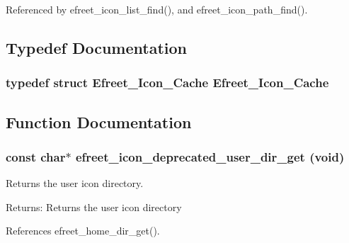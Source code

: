 Referenced by efreet\_\-icon\_\-list\_\-find(), and efreet\_\-icon\_\-path\_\-find().

\subsection{Typedef Documentation}
\subsubsection[Efreet\_\-Icon\_\-Cache]{\setlength{\rightskip}{0pt plus 5cm}typedef struct {\bf Efreet\_\-Icon\_\-Cache} {\bf Efreet\_\-Icon\_\-Cache}}\label{efreet__icon_8c_357003192381c449f058fd0380580be7}




\subsection{Function Documentation}
\subsubsection[efreet\_\-icon\_\-deprecated\_\-user\_\-dir\_\-get]{\setlength{\rightskip}{0pt plus 5cm}const char$\ast$ efreet\_\-icon\_\-deprecated\_\-user\_\-dir\_\-get (void)}\label{efreet__icon_8c_cc8dbdb67b18a402ac80b3121bb590e5}


Returns the user icon directory. 

\begin{Desc}
\item[Returns:]Returns the user icon directory \end{Desc}


References efreet\_\-home\_\-dir\_\-get().